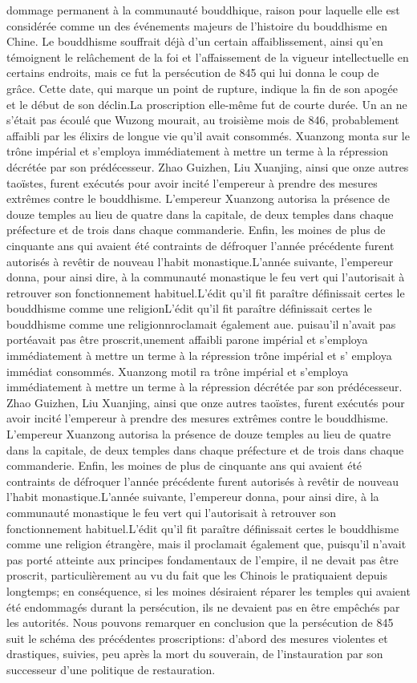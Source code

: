 dommage permanent à la communauté bouddhique, raison pour laquelle elle est considérée comme un des événements majeurs de l'histoire du bouddhisme en Chine. Le bouddhisme souffrait déjà d'un certain affaiblissement, ainsi qu'en témoignent le relâchement de la foi et l'affaissement de la vigueur intellectuelle en certains endroits, mais ce fut la persécution de 845 qui lui donna le coup de grâce. Cette date, qui marque un point de rupture, indique la fin de son apogée et le début de son déclin.La proscription elle-même fut de courte durée. Un an ne s'était pas écoulé que Wuzong mourait, au troisième mois de 846, probablement affaibli par les élixirs de longue vie qu'il avait consommés. Xuanzong monta sur le trône impérial et s'employa immédiatement à mettre un terme à la répression décrétée par son prédécesseur. Zhao Guizhen, Liu Xuanjing, ainsi que onze autres taoïstes, furent exécutés pour avoir incité l'empereur à prendre des mesures extrêmes contre le bouddhisme. L'empereur Xuanzong autorisa la présence de douze temples au lieu de quatre dans la capitale, de deux temples dans chaque préfecture et de trois dans chaque commanderie. Enfin, les moines de plus de cinquante ans qui avaient été contraints de défroquer l'année précédente furent autorisés à revêtir de nouveau l'habit monastique.L'année suivante, l'empereur donna, pour ainsi dire, à la communauté monastique le feu vert qui l'autorisait à retrouver son fonctionnement habituel.L'édit qu'il fit paraître définissait certes le bouddhisme comme une religionL'édit qu'il fit paraître définissait certes le bouddhisme comme une religionnroclamait également aue. puisau'il n'avait pas portéavait pas être proscrit,unement affaibli parone impérial et s'employa immédiatement à mettre un terme à la répression trône impérial et s' employa immédiat consommés. Xuanzong motil ra trône impérial et s'employa immédiatement à mettre un terme à la répression décrétée par son prédécesseur. Zhao Guizhen, Liu Xuanjing, ainsi que onze autres taoïstes, furent exécutés pour avoir incité l'empereur à prendre des mesures extrêmes contre le bouddhisme. L'empereur Xuanzong autorisa la présence de douze temples au lieu de quatre dans la capitale, de deux temples dans chaque préfecture et de trois dans chaque commanderie. Enfin, les moines de plus de cinquante ans qui avaient été contraints de défroquer l'année précédente furent autorisés à revêtir de nouveau l'habit monastique.L'année suivante, l'empereur donna, pour ainsi dire, à la communauté monastique le feu vert qui l'autorisait à retrouver son fonctionnement habituel.L'édit qu'il fit paraître définissait certes le bouddhisme comme une religion étrangère, mais il proclamait également que, puisqu'il n'avait pas porté atteinte aux principes fondamentaux de l'empire, il ne devait pas être proscrit, particulièrement au vu du fait que les Chinois le pratiquaient depuis longtemps; en conséquence, si les moines désiraient réparer les temples qui avaient été endommagés durant la persécution, ils ne devaient pas en être empêchés par les autorités. Nous pouvons remarquer en conclusion que la persécution de 845 suit le schéma des précédentes proscriptions: d'abord des mesures violentes et drastiques, suivies, peu après la mort du souverain, de l'instauration par son successeur d'une politique de restauration.

